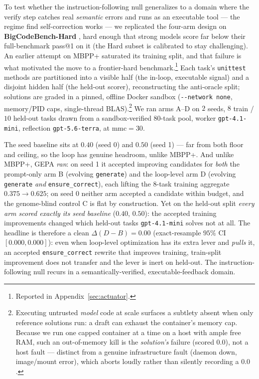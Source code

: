 \documentclass[11pt]{article}
\newcommand{\dd}{\ensuremath{\Delta}}
\begin{document}
To test whether the instruction-following null generalizes to a domain where the
verify step catches real \emph{semantic} errors and runs as an executable tool ---
the regime \citet{shinn2023reflexion} find self-correction works --- we replicated
the four-arm design on \textbf{BigCodeBench-Hard} \citep{zhuo2024bigcodebench}, hard
enough that strong models score far below their full-benchmark pass@1 on it (the Hard
subset is calibrated to stay challenging). An earlier attempt on MBPP+
\citep{liu2023evalplus} saturated its training split, and that failure is what motivated
the move to a frontier-hard benchmark.\footnote{Reported in Appendix~\ref{sec:actuator}.} Each task's \texttt{unittest} methods are partitioned into a visible half
(the in-loop, executable signal) and a disjoint hidden half (the held-out scorer),
reconstructing the anti-oracle split; solutions are graded in a pinned, offline Docker
sandbox (\texttt{-{}-network none}, memory/PID caps, single-thread BLAS).\footnote{Executing
untrusted \emph{model} code at scale surfaces a subtlety absent when only reference solutions
run: a draft can exhaust the container's memory cap. Because we run one capped container at a
time on a host with ample free RAM, such an out-of-memory kill is the \emph{solution's} failure
(scored $0.0$), not a host fault --- distinct from a genuine infrastructure fault (daemon down,
image/mount error), which aborts loudly rather than silently recording a $0.0$.} We ran arms
A--D on $2$ seeds, $8$ train / $10$ held-out tasks drawn from a sandbox-verified
$80$-task pool, worker \texttt{gpt-4.1-mini}, reflection \texttt{gpt-5.6-terra}, at
$\mathrm{mmc}=30$.

The seed baseline sits at $0.40$ (seed 0) and $0.50$ (seed 1) --- far from both floor
and ceiling, so the loop has genuine headroom, unlike MBPP+. And unlike MBPP+, GEPA
\emph{ran}: on seed 1 it accepted improving candidates for \emph{both} the prompt-only
arm B (evolving \texttt{generate}) and the loop-level arm D (evolving \texttt{generate}
\emph{and} \texttt{ensure\_correct}), each lifting the $8$-task training aggregate
$0.375 \to 0.625$; on seed 0 neither arm accepted a candidate within budget, and the
genome-blind control C is flat by construction. Yet on the held-out split \emph{every
arm scored exactly its seed baseline} ($0.40$, $0.50$): the accepted training
improvements changed which held-out tasks \texttt{gpt-4.1-mini} solves not at all. The
headline is therefore a clean $\dd(D-B)=0.00$ (exact-resample $95\%$ CI
$[0.000, 0.000]$): even when loop-level optimization has its extra lever and \emph{pulls} it,
an accepted \texttt{ensure\_correct} rewrite that improves training, train-split improvement
does not transfer and the lever is inert on held-out. The instruction-following null recurs in a
semantically-verified, executable-feedback domain.
\end{document}
